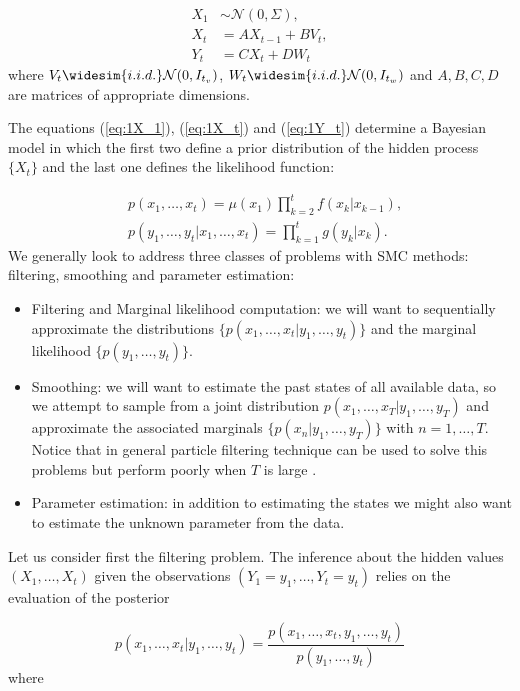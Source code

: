 \documentclass[11pt,a4paper]{article}
\begin{document}
\begin{align*}
    X_1 &\sim \mathcal{N}(0, \Sigma),\\
    X_t & = A X_{t-1} + B V_t, \\
    Y_t & = C X_t + D W_t
\end{align*}
where $V_t \widesim{i.i.d.} \mathcal{N}(0, I_{t_v})$, $W_t \widesim{i.i.d.} \mathcal{N}(0, I_{t_w})$ and $A, B, C, D$ are matrices of appropriate dimensions. 

The equations (\ref{eq:1X_1}), (\ref{eq:1X_t}) and (\ref{eq:1Y_t}) determine a Bayesian model in which the first two define a prior distribution of the hidden process $\{ X_t \}$ and the last one defines the likelihood function:

\begin{align*}
    & p(x_1, \dots, x_t) = \mu(x_1) \prod_{k=2}^t f(x_k | x_{k-1}), \\
    & p(y_1, \dots, y_t | x_1, \dots, x_t) = \prod_{k=1}^t g(y_k | x_k).
\end{align*}
We generally look to address three classes of problems with SMC methods: filtering, smoothing and parameter estimation:

\begin{itemize}
    \item Filtering and Marginal likelihood computation: we will want to sequentially approximate the distributions $\{ p(x_1, \dots, x_t | y_1, \dots, y_t) \}$ and the marginal likelihood $\{ p(y_1, \dots, y_t) \}$.
    \item Smoothing: we will want to estimate the past states of all available data, so we attempt to sample from a joint distribution $p(x_1, \dots, x_T | y_1, \dots, y_T)$ and approximate the associated marginals $\{ p(x_n | y_1, \dots, y_T)\}$ with $n = 1, \dots, T$. Notice that in general particle filtering technique can be used to solve this problems but perform poorly when $T$ is large \cite{DoucetTutorial}.
    \item Parameter estimation: in addition to estimating the states we might also want to estimate the unknown parameter from the data.
\end{itemize}

Let us consider first the filtering problem. The inference about the hidden values $(X_1, \dots, X_t)$ given the observations $(Y_1 = y_1, \dots, Y_t = y_t)$ relies on the evaluation of the posterior

\begin{equation*}
    p(x_1, \dots, x_t | y_1, \dots, y_t) = \frac{p(x_1, \dots, x_t, y_1, \dots, y_t)}{p(y_1, \dots, y_t)}
\end{equation*}
where
\end{document}

